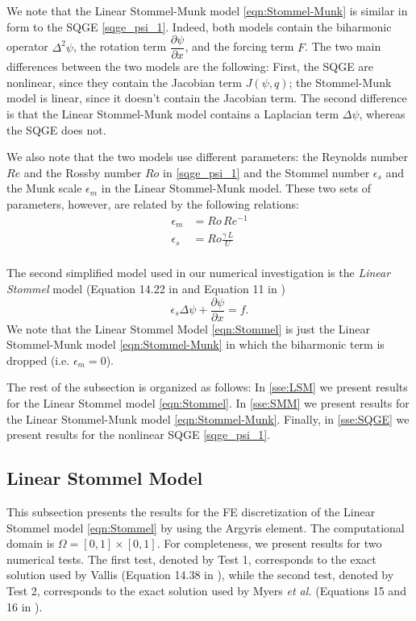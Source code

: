 We note that the Linear Stommel-Munk model \eqref{eqn:Stommel-Munk} is similar
in form to the SQGE \eqref{sqge_psi_1}. Indeed, both models contain the
biharmonic operator $\Delta^2 \psi$, the rotation term $\dfrac{\partial
\psi}{\partial x}$, and the forcing term $F$. The two main differences between
the two models are the following: First, the SQGE are nonlinear, since they
contain the Jacobian term $J(\psi,q)$; the Stommel-Munk model is linear, since
it doesn't contain the Jacobian term. The second difference is that the Linear
Stommel-Munk model contains a Laplacian term $\Delta \psi$, whereas the SQGE
does not.

We also note that the two models use different parameters: the Reynolds number
$Re$ and the Rossby number $Ro$ in \eqref{sqge_psi_1} and the Stommel number
$\epsilon_s$ and the Munk scale $\epsilon_m$ in the Linear Stommel-Munk model.
These two sets of parameters, however, are related by the following relations:
\begin{align}
  \epsilon_m &= Ro\, Re^{-1} \label{eqn:MunkScale}\\
  \epsilon_s &= Ro \frac{\gamma\, L}{U} \label{eqn:StommelNumber}\\
\end{align}

The second simplified model used in our numerical investigation is the
\emph{Linear Stommel} model (Equation 14.22 in \cite{Vallis06} and Equation 11
in \cite{Myers})
\begin{equation}
  \epsilon_s \Delta \psi + \frac{\partial \psi}{\partial x} = f.
  \label{eqn:Stommel}
\end{equation}
We note that the Linear Stommel Model \eqref{eqn:Stommel} is just the Linear
Stommel-Munk model \eqref{eqn:Stommel-Munk} in which the biharmonic term is
dropped (i.e. $\epsilon_m=0$).

The rest of the subsection is organized as follows: In \autoref{sse:LSM} we
present results for the Linear Stommel model \eqref{eqn:Stommel}. In
\autoref{sse:SMM} we present results for the Linear Stommel-Munk model
\eqref{eqn:Stommel-Munk}. Finally, in \autoref{sse:SQGE} we present results for
the nonlinear SQGE \eqref{sqge_psi_1}.

\subsection{Linear Stommel Model} \label{sse:LSM} This subsection presents the
results for the FE discretization of the Linear Stommel model
\eqref{eqn:Stommel} by using the Argyris element. The computational domain is
$\Omega = [0,1]\times [0,1]$. For completeness, we present results for two
numerical tests. The first test, denoted by Test 1, corresponds to the exact
solution used by Vallis (Equation 14.38 in \cite{Vallis06}), while the second
test, denoted by Test 2, corresponds to the exact solution used by Myers
\emph{et al.} (Equations 15 and 16 in \cite{Myers}).

